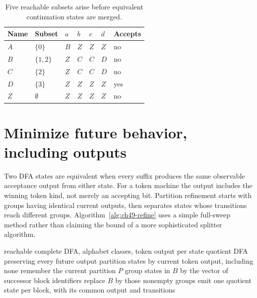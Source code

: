 \begin{table}[htbp]
\caption{Five reachable subsets arise before equivalent continuation states are merged.}
\label{tab:ch49-subsets}
\centering
\begin{tabular}{lllllll}
\toprule
Name & Subset & $a$ & $b$ & $c$ & $d$ & Accepts \\
\midrule
$A$ & $\{0\}$ & $B$ & $Z$ & $Z$ & $Z$ & no \\
$B$ & $\{1,2\}$ & $Z$ & $C$ & $C$ & $D$ & no \\
$C$ & $\{2\}$ & $Z$ & $C$ & $C$ & $D$ & no \\
$D$ & $\{3\}$ & $Z$ & $Z$ & $Z$ & $Z$ & yes \\
$Z$ & $\emptyset$ & $Z$ & $Z$ & $Z$ & $Z$ & no \\
\bottomrule
\end{tabular}
\end{table}

\section{Minimize future behavior, including outputs}
\label{sec:ch49-minimize}

Two DFA states are equivalent when every suffix produces the same observable acceptance output from either state.
For a token machine the output includes the winning token kind, not merely an accepting bit.
Partition refinement starts with groups having identical current outputs, then separates states whose transitions reach different groups.
Algorithm~\ref{alg:ch49-refine} uses a simple full-sweep method rather than claiming the bound of a more sophisticated splitter algorithm.

\begin{algorithm}[htbp]
\caption{Refine a complete token DFA until transition signatures agree within blocks.}
\label{alg:ch49-refine}
\begin{pseudocode}
\Require reachable complete DFA, alphabet classes, token output per state
\Ensure quotient DFA preserving every future output
\State partition states by current token output, including none
\Repeat
  \State remember the current partition $P$
    \State group states in $B$ by the vector of successor block identifiers
    \State replace $B$ by those nonempty groups
  \EndFor
{}
\State emit one quotient state per block, with its common output and transitions
\end{pseudocode}
\end{algorithm}


